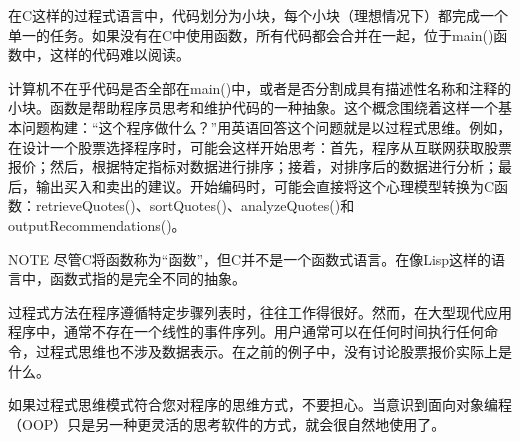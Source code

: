 在C这样的过程式语言中，代码划分为小块，每个小块（理想情况下）都完成一个单一的任务。如果没有在C中使用函数，所有代码都会合并在一起，位于main()函数中，这样的代码难以阅读。

计算机不在乎代码是否全部在main()中，或者是否分割成具有描述性名称和注释的小块。函数是帮助程序员思考和维护代码的一种抽象。这个概念围绕着这样一个基本问题构建：“这个程序做什么？”用英语回答这个问题就是以过程式思维。例如，在设计一个股票选择程序时，可能会这样开始思考：首先，程序从互联网获取股票报价；然后，根据特定指标对数据进行排序；接着，对排序后的数据进行分析；最后，输出买入和卖出的建议。开始编码时，可能会直接将这个心理模型转换为C函数：retrieveQuotes()、sortQuotes()、analyzeQuotes()和outputRecommendations()。

\begin{myNotic}{NOTE}
尽管C将函数称为“函数”，但C并不是一个函数式语言。在像Lisp这样的语言中，函数式指的是完全不同的抽象。
\end{myNotic}


过程式方法在程序遵循特定步骤列表时，往往工作得很好。然而，在大型现代应用程序中，通常不存在一个线性的事件序列。用户通常可以在任何时间执行任何命令，过程式思维也不涉及数据表示。在之前的例子中，没有讨论股票报价实际上是什么。

如果过程式思维模式符合您对程序的思维方式，不要担心。当意识到面向对象编程（OOP）只是另一种更灵活的思考软件的方式，就会很自然地使用了。







